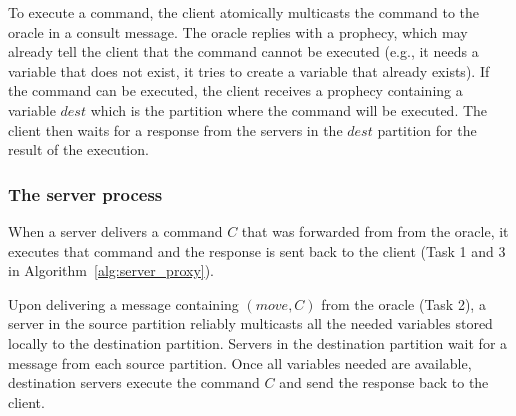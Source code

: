 To execute a command, the client atomically multicasts the command to the oracle in a consult message.
The oracle replies with a prophecy, which may already tell the client that the command cannot be executed (e.g., it needs a variable that does not exist, it tries to create a variable that already exists).
If the command can be executed, the client receives a prophecy containing a variable $dest$ which is the partition where the command will be executed. The client then waits for a response from the servers in the $dest$ partition for the result of the execution.

\subsubsection{The server process} 

When a server delivers a command $C$ that was forwarded from from the oracle, it executes that command and the response is sent back to the client (Task 1 and 3 in Algorithm~\ref{alg:server_proxy}).

Upon delivering a message containing $(move, C)$ from the oracle (Task 2), a server in the source partition reliably multicasts all the needed variables stored locally to the destination partition.
Servers in the destination partition wait for a message from each source partition. Once all variables needed are available, destination servers execute the command $C$ and send the response back to the client.


